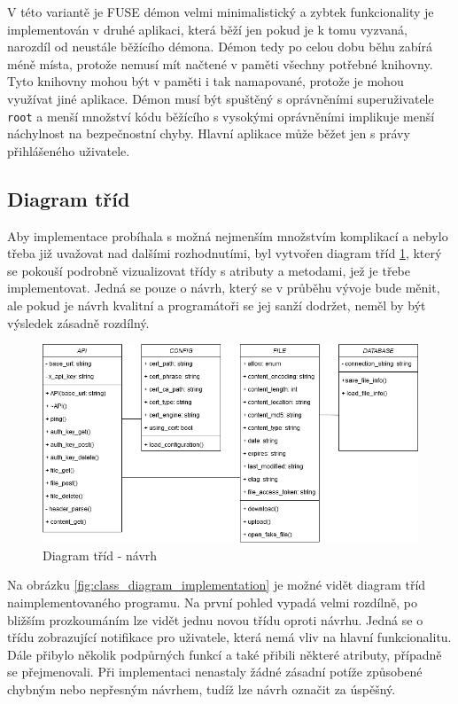 V této variantě je FUSE démon velmi minimalistický a zybtek funkcionality je implementován v druhé aplikaci, která běží jen pokud je k tomu vyzvaná, narozdíl od neustále
běžícího démona. Démon tedy po celou dobu běhu zabírá méně místa, protože nemusí mít načtené v paměti všechny potřebné knihovny. Tyto knihovny mohou být v paměti i tak
namapované, protože je mohou využívat jiné aplikace. Démon musí být spuštěný s oprávněními superuživatele \texttt{root} a menší množství kódu běžícího s vysokými
oprávněními implikuje menší náchylnost na bezpečnostní chyby. Hlavní aplikace může běžet jen s právy přihlášeného uživatele.

\subsection{Diagram tříd}

Aby implementace probíhala s možná nejmenším množstvím komplikací a nebylo třeba již uvažovat nad dalšími rozhodnutími, byl vytvořen diagram tříd \ref{fig:class_diagram_design},
který se pokouší podrobně vizualizovat třídy s atributy a metodami, jež je třebe implementovat. Jedná se pouze o návrh, který se v průběhu vývoje bude měnit, ale pokud je návrh
kvalitní a programátoři se jej sanží dodržet, neměl by být výsledek zásadně rozdílný.

\begin{figure}[h]
    \centering
    \includegraphics[width=1\linewidth]{other-fig/class_diagram_design.png}
    \caption{Diagram tříd - návrh}
    \label{fig:class_diagram_design}
\end{figure}

Na obrázku \ref{fig:class_diagram_implementation} je možné vidět diagram tříd naimplementovaného programu. Na první pohled vypadá velmi rozdílně, po bližším prozkoumáním
lze vidět jednu novou třídu oproti návrhu. Jedná se o třídu zobrazující notifikace pro uživatele, která nemá vliv na hlavní funkcionalitu. Dále přibylo několik podpůrných
funkcí a také přibili některé atributy, případně se přejmenovali. Při implementaci nenastaly žádné zásadní potíže způsobené chybným nebo nepřesným návrhem, tudíž lze
návrh označit za úspěšný.

